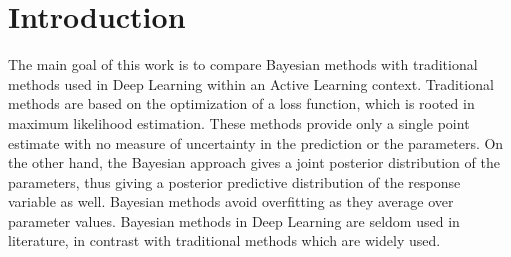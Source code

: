 
\chapter{Introduction}
\label{ch:intro}



The main goal of this work is to compare Bayesian methods with traditional methods used in Deep Learning within an Active Learning context. Traditional methods are based on the optimization of a loss function, which is rooted in maximum likelihood estimation. These methods provide only a single point estimate with no measure of uncertainty in the prediction or the parameters. On the other hand, the Bayesian approach gives a joint posterior distribution of the parameters, thus giving a posterior predictive distribution of the response variable as well. Bayesian methods avoid overfitting as they average over parameter values. Bayesian methods in Deep Learning are seldom used in literature, in contrast with traditional methods which are widely used.

